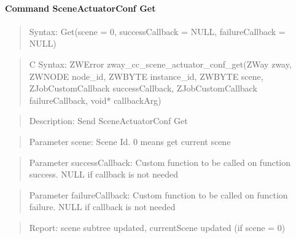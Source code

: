 \paragraph{Command SceneActuatorConf Get}
\begin{quote}Syntax: Get(scene = 0, successCallback = NULL, failureCallback = NULL)\end{quote}
\begin{quote}C Syntax: ZWError zway\_cc\_scene\_actuator\_conf\_get(ZWay zway, ZWNODE node\_id, ZWBYTE instance\_id, ZWBYTE scene, ZJobCustomCallback successCallback, ZJobCustomCallback failureCallback, void* callbackArg)\end{quote}
\begin{quote}Description: Send SceneActuatorConf Get\end{quote}
\begin{quote}Parameter scene: Scene Id. 0 means get current scene\end{quote}
\begin{quote}Parameter successCallback: Custom function to be called on function success. NULL if callback is not needed\end{quote}
\begin{quote}Parameter failureCallback: Custom function to be called on function failure. NULL if callback is not needed\end{quote}
\begin{quote}Report: scene subtree updated, currentScene updated (if scene = 0)\end{quote}

